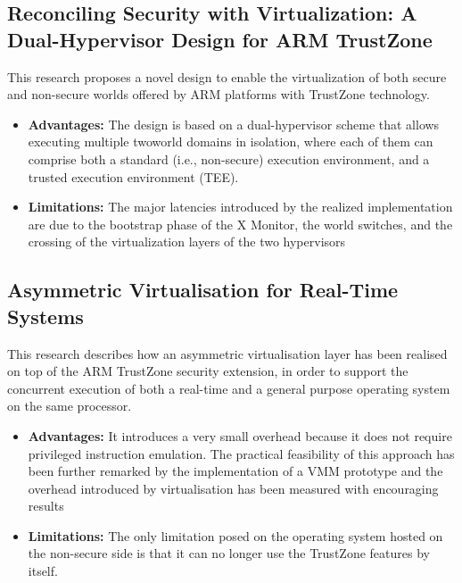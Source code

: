 \documentclass[conference]{IEEEtran}
\begin{document}
\subsection{Reconciling Security with Virtualization: A Dual-Hypervisor Design for ARM TrustZone}
\cite{hyper5} This research proposes a novel design to enable the virtualization of both secure and non-secure worlds offered by ARM platforms with TrustZone technology.
\begin{itemize}
    \item \textbf{Advantages:} The design is based on a dual-hypervisor scheme that allows executing multiple twoworld domains in isolation, where each of them can comprise both a standard (i.e., non-secure) execution environment, and a trusted execution environment (TEE).
    \item \textbf{Limitations:} The major latencies introduced by the realized implementation are due to the bootstrap phase of the X Monitor, the world switches, and the crossing of the virtualization layers of the two hypervisors
\end{itemize}


\subsection{Asymmetric Virtualisation for Real-Time Systems}
\cite{hyper6} This research describes how an asymmetric virtualisation layer has been realised on top of the ARM TrustZone security extension, in order to support the concurrent execution of both a real-time and a general purpose operating system on the same processor.
\begin{itemize}
    \item \textbf{Advantages:} It introduces a very small overhead because it does not require privileged instruction emulation. The practical feasibility of this approach has been further remarked by the implementation of a VMM prototype and the overhead introduced by virtualisation has been measured with encouraging results
    \item \textbf{Limitations:} The only limitation posed on the operating system hosted on the non-secure side is that it can no longer use the TrustZone features by itself.
\end{itemize}
\end{document}
